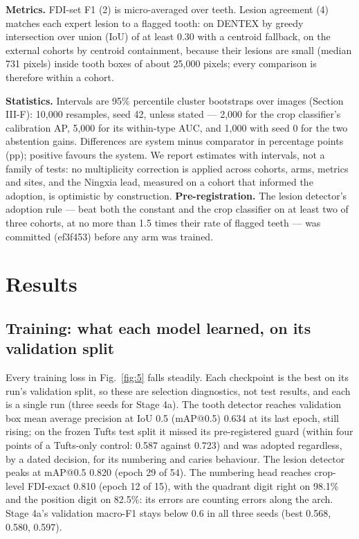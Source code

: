 \documentclass[conference]{IEEEtran}
\begin{document}
\textbf{Metrics.} FDI-set F1 (2) is micro-averaged over teeth. Lesion agreement (4) matches each expert lesion to a flagged tooth: on DENTEX by greedy intersection over union (IoU) of at least 0.30 with a centroid fallback, on the external cohorts by centroid containment, because their lesions are small (median 731 pixels) inside tooth boxes of about 25,000 pixels; every comparison is therefore within a cohort.

\textbf{Statistics.} Intervals are 95\% percentile cluster bootstraps over images (Section III-F): 10,000 resamples, seed 42, unless stated — 2,000 for the crop classifier's calibration AP, 5,000 for its within-type AUC, and 1,000 with seed 0 for the two abstention gains. Differences are system minus comparator in percentage points (pp); positive favours the system. We report estimates with intervals, not a family of tests: no multiplicity correction is applied across cohorts, arms, metrics and sites, and the Ningxia lead, measured on a cohort that informed the adoption, is optimistic by construction. \textbf{Pre-registration.} The lesion detector's adoption rule — beat both the constant and the crop classifier on at least two of three cohorts, at no more than 1.5 times their rate of flagged teeth — was committed (ef3f453) before any arm was trained.

\section{Results}

\subsection{Training: what each model learned, on its validation split}

Every training loss in Fig.~\ref{fig:5} falls steadily. Each checkpoint is the best on its run's validation split, so these are selection diagnostics, not test results, and each is a single run (three seeds for Stage 4a). The tooth detector reaches validation box mean average precision at IoU 0.5 (mAP@0.5) 0.634 at its last epoch, still rising; on the frozen Tufts test split it missed its pre-registered guard (within four points of a Tufts-only control: 0.587 against 0.723) and was adopted regardless, by a dated decision, for its numbering and caries behaviour. The lesion detector peaks at mAP@0.5 0.820 (epoch 29 of 54). The numbering head reaches crop-level FDI-exact 0.810 (epoch 12 of 15), with the quadrant digit right on 98.1\% and the position digit on 82.5\%: its errors are counting errors along the arch. Stage 4a's validation macro-F1 stays below 0.6 in all three seeds (best 0.568, 0.580, 0.597).
\end{document}
